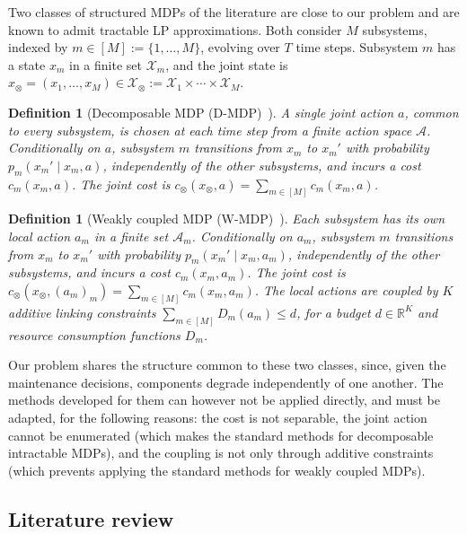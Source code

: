 \documentclass{article}
\newtheorem{definition}[proposition]{Definition}
\begin{document}
Two classes of structured MDPs of the literature are close to our problem and are known to admit tractable LP
approximations. Both consider $M$ subsystems, indexed by $m \in [M] := \{1,\ldots,M\}$, evolving over $T$ time steps.
Subsystem $m$ has a state $x_m$ in a finite set $\mathcal{X}_m$, and the joint state is $x_\otimes = (x_1,\ldots,x_M)
\in \mathcal{X}_\otimes := \mathcal{X}_1 \times \cdots \times \mathcal{X}_M$.

\begin{definition}[Decomposable MDP (D-MDP)~\cite{bertsimas2016}]
\label{def:dmdp}
A single joint action $a$, common to every subsystem, is chosen at each time step from a finite action space $\mathcal{A}$.
Conditionally on $a$, subsystem $m$ transitions from $x_m$ to $x_m'$ with probability $p_m(x_m' \mid x_m, a)$,
independently of the other subsystems, and incurs a cost $c_m(x_m,a)$. The joint cost is
$c_\otimes(x_\otimes, a) = \sum_{m \in [M]} c_m(x_m, a)$.
\end{definition}

\begin{definition}[Weakly coupled MDP (W-MDP)~\cite{hawkins2003}]
\label{def:wmdp}
Each subsystem has its own local action $a_m$ in a finite set $\mathcal{A}_m$. Conditionally on $a_m$, subsystem $m$
transitions from $x_m$ to $x_m'$ with probability $p_m(x_m' \mid x_m, a_m)$, independently of the other subsystems,
and incurs a cost $c_m(x_m,a_m)$. The joint cost is $c_\otimes(x_\otimes,(a_m)_{m}) = \sum_{m \in [M]} c_m(x_m,a_m)$.
The local actions are coupled by $K$ additive linking constraints $\sum_{m \in [M]} D_m(a_m) \le d$, for a budget
$d \in \mathbb{R}^K$ and resource consumption functions $D_m$.
\end{definition}

Our problem shares the structure common to these two classes, since, given the maintenance decisions, components
degrade independently of one another. The methods developed for them can however not be applied directly, and must be
adapted, for the following reasons: the cost is not separable, the joint action cannot be enumerated (which makes the standard 
methods for decomposable intractable MDPs), and the coupling is not only through additive constraints (which prevents applying
the standard methods for weakly coupled MDPs).

\subsection{Literature review}
\label{sec:literature-review}
\end{document}
